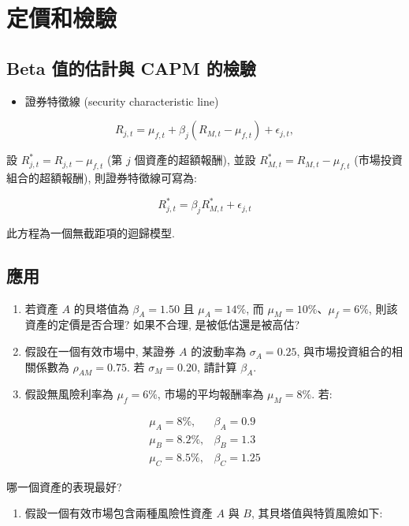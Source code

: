 \documentclass[letterpaper]{article}
\begin{document}
		
		\section{定價和檢驗}
		\subsection{Beta 值的估計與 CAPM 的檢驗}
		\begin{itemize}
			\item 證券特徵線 (security characteristic line) 
		\end{itemize}
		
		$$
		R_{j, t}=\mu_{f, t}+\beta_{j}\left (R_{M, t}-\mu_{f, t}\right) +\epsilon_{j, t}, 
		$$
		
		設 $R_{j, t}^{*} = R_{j, t} - \mu_{f, t}$ (第 $j$ 個資產的超額報酬), 
		並設 $R_{M, t}^{*} = R_{M, t} - \mu_{f, t}$ (市場投資組合的超額報酬), 
		則證券特徵線可寫為: 
		
		$$
		R_{j, t}^{*} = \beta_{j} R_{M, t}^{*} + \epsilon_{j, t}
		$$
		
		此方程為一個無截距項的迴歸模型. 
		
		\subsection{應用}
		\begin{enumerate}
			\item 若資產 $A$ 的貝塔值為 $\beta_{A}=1.50$ 且 $\mu_{A}=14\%$, 而 $\mu_{M}=10\%$、$\mu_{f}=6\%$, 則該資產的定價是否合理? 如果不合理, 是被低估還是被高估? 
			\item 假設在一個有效市場中, 某證券 $A$ 的波動率為 $\sigma_{A}=0.25$, 與市場投資組合的相關係數為 $\rho_{AM}=0.75$. 若 $\sigma_{M}=0.20$, 請計算 $\beta_{A}$. 
			\item 假設無風險利率為 $\mu_{f}=6\%$, 市場的平均報酬率為 $\mu_{M}=8\%$. 若: 
		\end{enumerate}
		
		
		$$
		\begin{array}{ll}
			\mu_{A}=8 \%, & \beta_{A}=0.9 \\
			\mu_{B}=8.2 \%, & \beta_{B}=1.3 \\
			\mu_{C}=8.5 \%, & \beta_{C}=1.25
		\end{array}
		$$
		
		哪一個資產的表現最好? 
		
		\begin{enumerate}
			\item 假設一個有效市場包含兩種風險性資產 $A$ 與 $B$, 其貝塔值與特質風險如下: 
		\end{enumerate}
		
\end{document}
